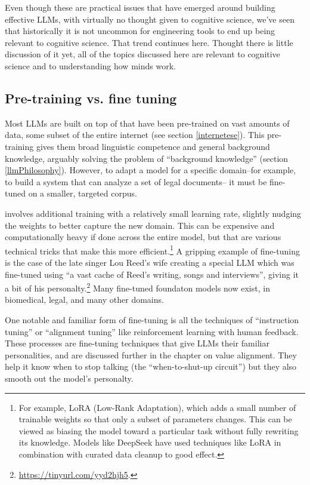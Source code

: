 Even though these are practical issues that have emerged around building
effective LLMs, with virtually no thought given to cognitive science, we've
seen that historically it is not uncommon for engineering tools to end up being
relevant to cognitive science. That trend continues here. Thought there is
little discussion of it yet, all of the topics discussed here are relevant to
cognitive science and to understanding how minds work. 

\subsection{Pre-training vs. fine tuning} 

Most LLMs are built on top of  that have been
pre-trained on vast amounts of data, some subset of the entire internet (see
section \ref{internetese}). This pre-training gives them broad linguistic
competence and general background knowledge, arguably solving the problem of
``background knowledge'' (section \ref{llmPhilosophy}).  However, to adapt a
model for a specific domain--for example, to build a system that can analyze a
set of legal documents-- it must be fine-tuned on a smaller, targeted corpus.

  involves additional training with a relatively small
 learning rate, slightly nudging the weights to better capture the new domain.
 This can be expensive and computationally heavy if done across the entire
 model, but that are various technical tricks that make this more
 efficient.\footnote{For example, LoRA (Low-Rank Adaptation), which adds a
 small number of trainable weights so that only a subset of parameters changes.
 This can be viewed as biasing the model toward a particular task without fully
 rewriting its knowledge. Models like DeepSeek have used techniques like LoRA
 in combination with curated data cleanup to good effect.} A gripping example
 of fine-tuning is the case of the late singer Lou Reed's wife creating a
 special LLM which was fine-tuned using ``a vast cache of Reed's writing, songs
 and interviews'', giving it a bit of his
 personalty.\footnote{\url{https://tinyurl.com/yyd2hjh5}.}  Many fine-tuned
 foundaton models now exist, in biomedical, legal, and many other domains.
 
 One notable and familiar form of fine-tuning is all the techniques of
 ``instruction tuning'' or ``alignment tuning'' like reinforcement learning
 with human feedback.  These processes are fine-tuning techniques that give
 LLMs their familiar personalities, and are discussed further in the chapter on
 value alignment. They help it know when to stop talking (the ``when-to-shut-up
 circuit'') but they also smooth out the model's personalty. 

